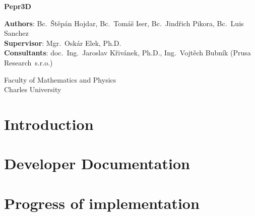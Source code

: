 \documentclass[12pt,a4paper]{report}
\begin{document}
\begin{titlepage}
    \begin{center}
        \vspace*{1cm}

        \Huge
        \textbf{Pepr3D}

        \LARGE

        \vspace{12cm}

		\Large
        \textbf{Authors}:
        Bc.~Štěpán Hojdar,
        Bc.~Tomáš Iser,
        Bc.~Jindřich Pikora,
		Bc.~Luis Sanchez
		\\
		\textbf{Supervisor}: Mgr.~Oskár Elek, Ph.D.
		\\
		\textbf{Consultants}: doc.~Ing.~Jaroslav Křivánek, Ph.D., Ing.~Vojtěch Bubník (Prusa Research~s.r.o.)

        \vfill

		Faculty of Mathematics and Physics \\
		Charles University
    \end{center}
\end{titlepage}

\setcounter{tocdepth}{1}
\tableofcontents

\part{Introduction}




\part{Developer Documentation}












\part{Progress of implementation}
\end{document}
